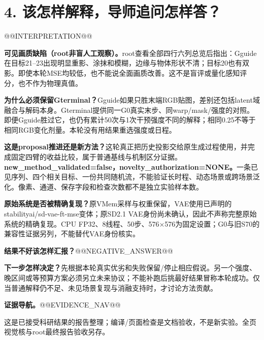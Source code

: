 \documentclass[UTF8,10pt,a4paper]{ctexart}
\begin{document}
\clearpage
\section*{4. 该怎样解释，导师追问怎样答？}
@@INTERPRETATION@@

\textbf{可见画质缺陷（root非盲人工观察）。}root查看全部四行六列总览后指出：Gguide在目标21--23出现明显重影、涂抹和模糊，边缘与物体形状不清；目标20也有双影。即使本轮MSE均较低，也不能说全面画质改善。这不是盲评或量化感知评分，也不作为物理真值。

\textbf{为什么必须保留Gterminal？}Gguide如果只胜末端RGB贴图，差别还包括latent域融合与解码本身。Gterminal提供同一G0真实末步、同warp/mask/强度的对照。即便Gguide胜过它，也仍有累计50次与1次干预强度不同的解释；相同0.25不等于相同RGB变化剂量。本轮没有用结果重选强度或日程。

\textbf{这是proposal推进还是新方法？}这轮真正把历史投影交给原生成过程使用，并完成固定四臂的收益比较，属于普通基线与机制区分证据。\textbf{new\_method\_validated=false，novelty\_authorization=NONE。}一条已见序列、四个相关目标、一份共同随机流，不能验证长时程、动态场景或跨场景泛化。像素、通道、保存字段和检查次数都不是独立实验样本数。

\textbf{原始系统是否被精确复现？}原VMem采样与权重保留，VAE使用已声明的stabilityai/sd-vae-ft-mse变体；原SD2.1 VAE身份尚未确认，因此不声称完整原始系统的精确复现。CPU FP32、8线程、50步、576×576为固定设置；G0与旧S70的兼容性证据另列，不能替代VAE身份核实。

\textbf{结果不好该怎样汇报？}@@NEGATIVE_ANSWER@@

\textbf{下一步怎样决定？}先根据本轮真实优劣和失败保留/停止相应假说。另一个强度、晚区间或等预算方案必须另立未来协议；不能补跑后挑最好结果冒称本轮成功。仅当普通解释仍不足、未见场景复现与消融支持时，才讨论方法贡献。

\textbf{证据导航。}@@EVIDENCE_NAV@@

\vfill\noindent\small\textcolor{accent}{这是已接受科研结果的报告整理；编译/页面检查是文档验收，不是新实验。全页视觉核与root最终报告验收另存。}
\end{document}
